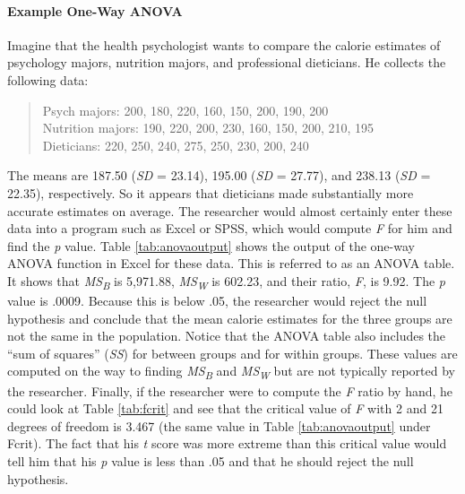 \documentclass[
]{krantz}
\begin{document}
\hypertarget{example-one-way-anova}{%
\paragraph*{Example One-Way ANOVA}\label{example-one-way-anova}}

Imagine that the health psychologist wants to compare the calorie estimates of psychology majors, nutrition majors, and professional dieticians. He collects the following data:

\begin{quote}
Psych majors: 200, 180, 220, 160, 150, 200, 190, 200\\
Nutrition majors: 190, 220, 200, 230, 160, 150, 200, 210, 195\\
Dieticians: 220, 250, 240, 275, 250, 230, 200, 240
\end{quote}

The means are 187.50 (\emph{SD} = 23.14), 195.00 (\emph{SD} = 27.77), and 238.13 (\emph{SD} = 22.35), respectively. So it appears that dieticians made substantially more accurate estimates on average. The researcher would almost certainly enter these data into a program such as Excel or SPSS, which would compute \emph{F} for him and find the \emph{p} value. Table \ref{tab:anovaoutput} shows the output of the one-way ANOVA function in Excel for these data. This is referred to as an ANOVA table. It shows that \emph{MS\textsubscript{B}} is 5,971.88, \emph{MS\textsubscript{W}} is 602.23, and their ratio, \emph{F}, is 9.92. The \emph{p} value is .0009. Because this is below .05, the researcher would reject the null hypothesis and conclude that the mean calorie estimates for the three groups are not the same in the population. Notice that the ANOVA table also includes the ``sum of squares'' (\emph{SS}) for between groups and for within groups. These values are computed on the way to finding \emph{MS\textsubscript{B}} and \emph{MS\textsubscript{W}} but are not typically reported by the researcher. Finally, if the researcher were to compute the \emph{F} ratio by hand, he could look at Table \ref{tab:fcrit} and see that the critical value of \emph{F} with 2 and 21 degrees of freedom is 3.467 (the same value in Table \ref{tab:anovaoutput} under Fcrit). The fact that his \emph{t} score was more extreme than this critical value would tell him that his \emph{p} value is less than .05 and that he should reject the null hypothesis.
\end{document}
